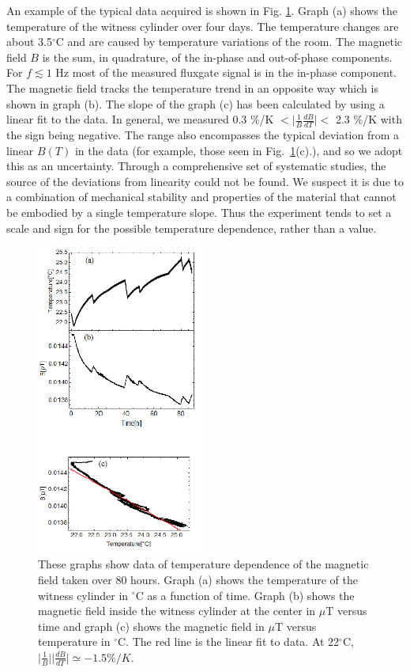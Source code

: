 \documentclass[review]{elsarticle}
\begin{document}
An example of the typical data acquired is shown in
Fig. \ref{fig:B_vs_Temp}. Graph (a) shows the temperature of the
witness cylinder over four days. The temperature changes are about
3.5$^\circ$C and are caused by temperature variations of the room. The
magnetic field $B$ is the sum, in quadrature, of the in-phase and
out-of-phase components. For $f\lesssim 1$ Hz most of the measured
fluxgate signal is in the in-phase component. The magnetic field
tracks the temperature trend in an opposite way which is shown in
graph (b). The slope of the graph (c) has been calculated by using a
linear fit to the data. In general, we measured 0.3 \%/K $< \vert
\frac{1}{B} \frac{dB}{dT} \vert <$ 2.3 \%/K with the sign being
negative. The range also encompasses the typical deviation from a
linear $B(T)$ in the data (for example, those seen in
Fig.~\ref{fig:B_vs_Temp}(c).), and so we adopt this as an
uncertainty. Through a comprehensive set of systematic studies, the
source of the deviations from linearity could not be found. We suspect
it is due to a combination of mechanical stability and properties of
the material that cannot be embodied by a single temperature
slope. Thus the experiment tends to set a scale and sign for the
possible temperature dependence, rather than a value.
  \begin{figure}[h!]
\begin{center}
   \includegraphics[width=0.5\textwidth]{B_vs_T.png}
    \caption{These graphs show data of temperature dependence of the
      magnetic field taken over 80 hours. Graph (a) shows the
      temperature of the witness cylinder in $^\circ$C as a function
      of time. Graph (b) shows the magnetic field inside the witness
      cylinder at the center in $\mu$T versus time and graph (c) shows
      the magnetic field in $\mu$T versus temperature in
      $^\circ$C. The red line is the linear fit to data. At
      22$^\circ$C, $\vert \frac{1}{B}\vert \vert
      \frac{dB}{dT}\vert\simeq -1.5 \% /K.$ }
    \label{fig:B_vs_Temp}
     \vspace{-2.em}
    \end{center}
\end{figure} 
\end{document}

